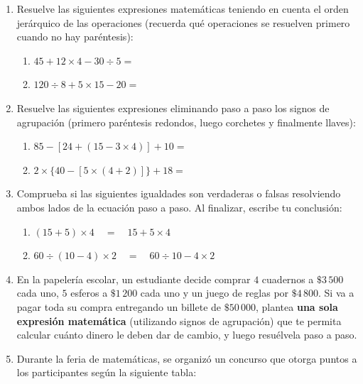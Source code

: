 \documentclass[12pt, letterpaper]{article}
\begin{document}
	\begin{enumerate}[itemsep=0.8cm]
		
		\item Resuelve las siguientes expresiones matemáticas teniendo en cuenta el orden jerárquico de las operaciones (recuerda qué operaciones se resuelven primero cuando no hay paréntesis):
		\begin{enumerate}[label=\alph*., itemsep=0.2cm, topsep=0.2cm]
			\item $45 + 12 \times 4 - 30 \div 5 = $
			\item $120 \div 8 + 5 \times 15 - 20 = $
		\end{enumerate}
		
		\item Resuelve las siguientes expresiones eliminando paso a paso los signos de agrupación (primero paréntesis redondos, luego corchetes y finalmente llaves):
		\begin{enumerate}[label=\alph*., itemsep=0.2cm, topsep=0.2cm]
			\item $85 - [ 24 + (15 - 3 \times 4) ] + 10 = $
			\item $2 \times \{ 40 - [ 5 \times (4 + 2) ] \} + 18 = $
		\end{enumerate}
		
		\item Comprueba si las siguientes igualdades son verdaderas o falsas resolviendo ambos lados de la ecuación paso a paso. Al finalizar, escribe tu conclusión:
		\begin{enumerate}[label=\alph*., itemsep=0.2cm, topsep=0.2cm]
			\item $(15 + 5) \times 4 \quad = \quad 15 + 5 \times 4$
			\item $60 \div (10 - 4) \times 2 \quad = \quad 60 \div 10 - 4 \times 2$
		\end{enumerate}
		
		\item En la papelería escolar, un estudiante decide comprar $4$ cuadernos a $\$3\,500$ cada uno, $5$ esferos a $\$1\,200$ cada uno y un juego de reglas por $\$4\,800$. Si va a pagar toda su compra entregando un billete de $\$50\,000$, plantea \textbf{una sola expresión matemática} (utilizando signos de agrupación) que te permita calcular cuánto dinero le deben dar de cambio, y luego resuélvela paso a paso.
		
		\item Durante la feria de matemáticas, se organizó un concurso que otorga puntos a los participantes según la siguiente tabla:
		

\end{enumerate}
\end{document}
